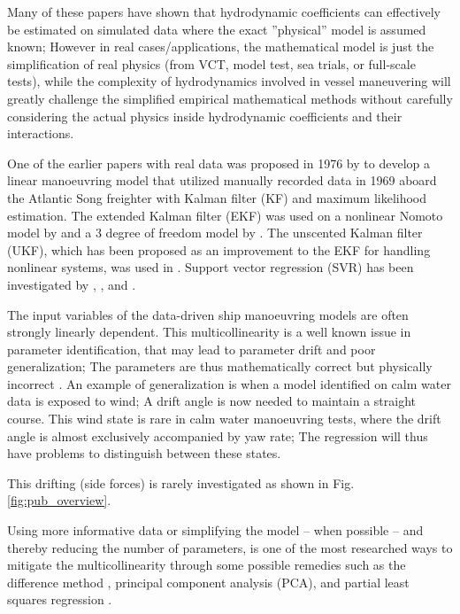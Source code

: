 Many of these papers have shown that hydrodynamic coefficients can effectively be estimated on simulated data where the exact ''physical'' model is assumed known; However in real cases/applications, the mathematical model is just the simplification of real physics (from VCT, model test, sea trials, or full-scale tests), while the complexity of hydrodynamics involved in vessel maneuvering will greatly challenge the simplified empirical mathematical methods without carefully considering the actual physics inside hydrodynamic coefficients and their interactions. 

One of the earlier papers with real data was proposed in 1976 by \citet{astrom_identification_1976} to develop a linear manoeuvring model that utilized manually recorded data in 1969 aboard the Atlantic Song freighter with Kalman filter (KF) and maximum likelihood estimation. 
The extended Kalman filter (EKF) was used on a nonlinear Nomoto model by \citet{perera_system_2015} and a 3 degree of freedom model by \citet{shi_identification_2009}. The unscented Kalman filter (UKF), which has been proposed as an improvement to the EKF for handling nonlinear systems, was used in \citet{revestido_herrero_two-step_2012}.
Support vector regression (SVR) has been investigated by \citet{luo_parameter_2016}, \citet{zhu_parameter_2017}, and \citet{wang_parameter_2021}. 

%
The input variables of the data-driven ship manoeuvring models are often strongly linearly dependent. This multicollinearity is a well known issue in parameter identification, that may lead to parameter drift and poor generalization; The parameters are thus mathematically correct but physically incorrect \citep{luo_parameter_2016}. 
An example of generalization is when a model identified on calm water data is exposed to wind; A drift angle is now needed to maintain a straight course. This wind state is rare in calm water manoeuvring tests, where the drift angle is almost exclusively accompanied by yaw rate; 
The regression will thus have problems to distinguish between these states.

This drifting (side forces) is rarely investigated as shown in Fig.\ref{fig:pub_overview}.

Using more informative data or simplifying the model -- when possible -- and thereby reducing the number of parameters, is one of the most researched ways to mitigate the multicollinearity through some possible remedies such as the difference method \citep{luo_parameter_2016}, principal component analysis (PCA), and partial least squares regression \citep{jian-chuan_parametric_2015}. 

